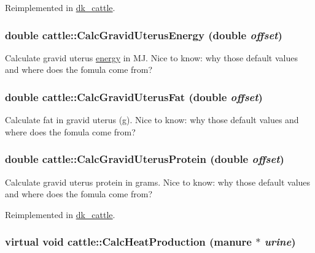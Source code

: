 Reimplemented in \hyperlink{classdk__cattle_a717bc099891c28ae2f35203a23bc1b12}{dk\_\-cattle}.\hypertarget{classcattle_a2b592878b7c6d87baff5414c008e9015}{
\subsubsection[{CalcGravidUterusEnergy}]{\setlength{\rightskip}{0pt plus 5cm}double cattle::CalcGravidUterusEnergy (double {\em offset})}}
\label{classcattle_a2b592878b7c6d87baff5414c008e9015}
Calculate gravid uterus \hyperlink{classenergy}{energy} in MJ. Nice to know: why those default values and where does the fomula come from? \hypertarget{classcattle_a795f803883c77aae60e3c722fed59e6d}{
\subsubsection[{CalcGravidUterusFat}]{\setlength{\rightskip}{0pt plus 5cm}double cattle::CalcGravidUterusFat (double {\em offset})}}
\label{classcattle_a795f803883c77aae60e3c722fed59e6d}
Calculate fat in gravid uterus (g). Nice to know: why those default values and where does the fomula come from? \hypertarget{classcattle_ababba75682af1059250b4a92eedd4a64}{
\subsubsection[{CalcGravidUterusProtein}]{\setlength{\rightskip}{0pt plus 5cm}double cattle::CalcGravidUterusProtein (double {\em offset})}}
\label{classcattle_ababba75682af1059250b4a92eedd4a64}
Calculate gravid uterus protein in grams. Nice to know: why those default values and where does the fomula come from? 

Reimplemented in \hyperlink{classdk__cattle_a86bb4b01472df3578ac25b97d39af5b8}{dk\_\-cattle}.\hypertarget{classcattle_a684a6bc701b487ecb37887a81c72f52e}{
\subsubsection[{CalcHeatProduction}]{\setlength{\rightskip}{0pt plus 5cm}virtual void cattle::CalcHeatProduction ({\bf manure} $\ast$ {\em urine})}}
\label{classcattle_a684a6bc701b487ecb37887a81c72f52e}


